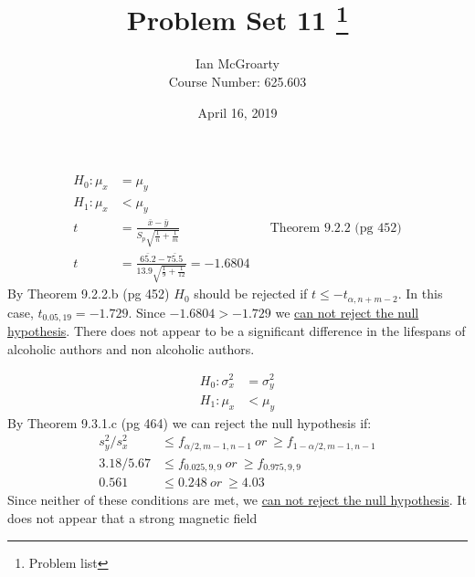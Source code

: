 \documentclass[12pt]{article}
\title{Problem Set 11 \thanks{Problem list }}
\author{Ian McGroarty \\
	Course Number: 625.603}
\date{April 16, 2019}
\newenvironment{problem}[2][Problem]{\begin{trivlist}
\item[\hskip \labelsep {\bfseries #1}\hskip \labelsep {\bfseries #2.}]}{\end{trivlist}}
\begin{document}
\maketitle
\newpage

\begin{problem}{9.2.6} 
	\begin{align*}
		H_0: \mu_x &= \mu_y \\
		H_1: \mu_x &< \mu_y  \\
	t&= \frac{\bar{x} - \bar{y}}{S_p\sqrt{\frac{1}{n} + \frac{1}{m}}} && \text{Theorem 9.2.2 (pg 452)} \\
	t&= \frac{\bar{65.2} - \bar{75.5}}{13.9\sqrt{\frac{1}{9} + \frac{1}{12}}} = -1.6804 
	\end{align*}
By Theorem 9.2.2.b (pg 452) $H_0$ should be rejected if $t\leq -t_{\alpha , n+m-2}$. In this case, $t_{0.05,19} = -1.729$. Since $-1.6804 > -1.729 $ we \underline{can not reject the null hypothesis}. There does not appear to be a significant difference in the lifespans of alcoholic authors and non alcoholic authors. 
\end{problem}

\begin{problem}{9.3.4}
	\begin{align*}
		H_0: \sigma^2_x &= \sigma^2_y \\
		H_1: \mu_x &< \mu_y  
	\end{align*}
By Theorem 9.3.1.c (pg 464) we can reject the null hypothesis if: 
\begin{align*}
s^2_y/s^2_x &\leq f_{\alpha /2, m-1,n-1} \ or \  \geq  f_{1-\alpha /2, m-1,n-1}\\
3.18/5.67 & \leq f_{0.025,9,9} \  or \ \geq f_{0.975,9,9} \\
0.561& \leq 0.248 \ or \ \geq 4.03
\end{align*}
Since neither of these conditions are met, we \underline{can not reject the null hypothesis}. It does not appear that a strong magnetic field 
\end{problem}
\end{document}
